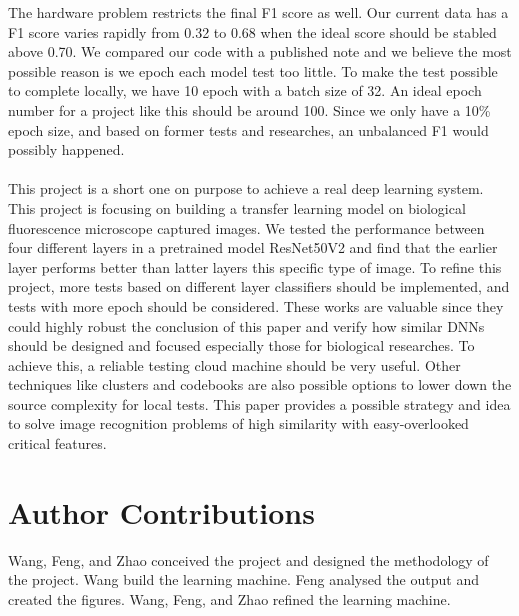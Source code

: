 \documentclass{article}
\begin{document}
The hardware problem restricts the final F1 score as well. Our current data has a F1 score varies rapidly from 0.32 to 0.68 when the ideal score should be stabled above 0.70. We compared our code with a published note and we believe the most possible reason is we epoch each model test too little. To make the test possible to complete locally, we have 10 epoch with a batch size of 32. An ideal epoch number for a project like this should be around 100. Since we only have a 10\% epoch size, and based on former tests and researches, an unbalanced F1 would possibly happened.
\\
\\
This project is a short one on purpose to achieve a real deep learning system. This project is focusing on building a transfer learning model on biological fluorescence microscope captured images. We tested the performance between four different layers in a pretrained model ResNet50V2 and find that the earlier layer performs better than latter layers this specific type of image. To refine this project, more tests based on different layer classifiers should be implemented, and tests with more epoch should be considered. These works are valuable since they could highly robust the conclusion of this paper and verify how similar DNNs should be designed and focused especially those for biological researches. To achieve this, a reliable testing cloud machine should be very useful. Other techniques like clusters and codebooks are also possible options to lower down the source complexity for local tests. This paper provides a possible strategy and idea to solve image recognition problems of high similarity with easy-overlooked critical features.

\section{Author Contributions}
Wang, Feng, and Zhao conceived the project and designed the methodology of the project. Wang build the learning machine. Feng analysed the output and created the figures. Wang, Feng, and Zhao refined the learning machine. 

\newpage


\end{document}
